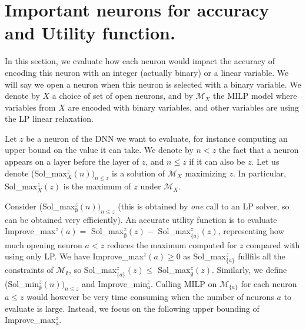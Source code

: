 \section{Important neurons for accuracy and Utility function.}

In this section, we evaluate how each neuron would impact the accuracy of encoding this neuron with an integer (actually binary) or a linear variable. We will say we open a neuron when this neuron is selected with a binary variable. We denote by $X$ a choice of set of open neurons, and by $\mathcal{M}_X$ the MILP model where variables from $X$ are encoded with binary variables, and other variables are using the LP linear relaxation.

Let $z$ be a neuron of the DNN we want to evaluate, for instance computing an upper bound on the value it can take. We denote by $n< z$ the fact that a neuron appears on a layer before the layer of $z$, and $n \leq z$ if it can also be $z$.
Let us denote (Sol\_max$_X^z(n))_{n \leq z}$ is a solution of $\mathcal{M}_X$ 
maximizing $z$. In particular, Sol\_max$_X^z(z)$ is the maximum of $z$ under $\mathcal{M}_X$.

Consider (Sol\_max$_\emptyset^z(n))_{n \leq z}$ (this is obtained by {\em one} call to an LP solver, so can be obtained very efficiently).
An accurate utility function is to evaluate 
Improve\_max$^z(a)=$ Sol\_max$_\emptyset^z(z) -$ Sol\_max$_{\{a\}}^z(z)$, 
representing how much opening neuron $a < z$ reduces the maximum computed for $z$
compared with using only LP. 
We have Improve\_max$^z(a)\geq 0$ as Sol\_max$_{\{a\}}^z$ fullfils all the constraints of 
$\mathcal{M}_\emptyset$, so Sol\_max$_{\{a\}}^z(z) \leq$ Sol\_max$_\emptyset^z(z)$.
Similarly, we define (Sol\_min$_\emptyset^z(n))_{n \leq z}$ and 
Improve\_min$_a^z$. Calling MILP on $\mathcal{M}_{\{a\}}$ for each neuron $a \leq z$
would however be very time consuming when the number of neurons $a$ to evaluate is large.
Instead, we focus on the following upper bounding of Improve\_max$_a^z$.








